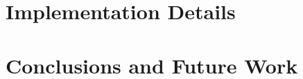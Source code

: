 \documentclass{llncs}
\begin{document}




\section{Implementation Details}

\section{Conclusions and Future Work}


% 
% 
\end{document}
